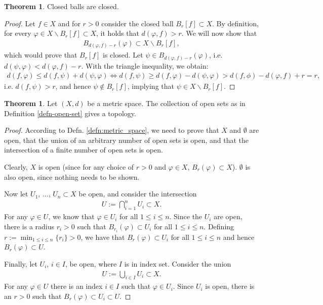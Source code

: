 \documentclass[12pt, a4paper]{article}
\numberwithin{equation}{section}
\theoremstyle{definition}
\theoremstyle{definition}
\newtheorem{theorem}[thm]{Theorem}
\begin{document}
	\begin{theorem}\label{thrm:closed_balls_open}
		Closed balls are closed.
	\end{theorem}
	
	\begin{proof}
		Let $f\in X$ and for $r > 0$ consider the closed ball $B_{r}[f]\subset X$. By definition, for every $\varphi \in X\backslash B_{r}[f]\subset X$, it holds that $d(\varphi, f) > r$. We will now show that 
		\begin{align}
			B_{d(\varphi, f) - r}(\varphi) \subset X \backslash B_{r}[f],
		\end{align}
		which would prove that $B_{r}[f]$ is closed. Let $\psi\in B_{d(\varphi, f) - r}(\varphi)$, i.e. $d(\psi, \varphi) < d(\varphi, f) -r$. With the triangle inequality, we obtain:
		\begin{align}
			d(f, \varphi) \leq d(f, \psi) + d(\psi, \varphi) \Leftrightarrow d(f, \psi) \geq d(f, \varphi) - d(\psi, \varphi) > d(f, \phi) - d(\varphi, f) + r = r, 
		\end{align}
		i.e. $d(f, \psi) > r$, and hence $\psi\notin B_r[f]$, implying that $\psi\in X\backslash B_{r}[f]$. 
	\end{proof}
	
	\begin{theorem}\label{thrm:open_sets_form_topology}
		Let $(X, d)$ be a metric space. The collection of open sets as in Definition \ref{defn-open-set} gives a topology.
	\end{theorem}
	\begin{proof}		
		According to Defn. \ref{defn:metric_space}, we need to prove that $X$ and $\emptyset$ are open, that the union of an arbitrary number of open sets is open, and that the intersection of a finite number of open sets is open. 
		
		Clearly, $X$ is open (since for any choice of $r > 0$ and $\varphi\in X$, $B_{r}(\varphi)\subset X$). $\emptyset$ is also open, since nothing needs to be shown.
		
		Now let $U_{1}$, $\dots$, $U_{n}\subset X$ be open, and consider the intersection
		\begin{align}
			U := \bigcap_{i=1}^{n}U_{i} \subset X.
		\end{align} 
		For any $\varphi\in U$, we know that $\varphi\in U_i$ for all $1\leq i \leq n$. Since the $U_{i}$ are open, there is a radius $r_{i} > 0$ such that $B_{r_i}(\varphi) \subset U_i$ for all $1\leq i \leq n$. Defining $r := \min_{1 \leq i \leq n}\{r_{i}\} > 0$, we have that $B_{r}(\varphi) \subset U_i$ for all $1\leq i\leq n$ and hence $B_{r}(\varphi)\subset U$.
		
		Finally, let $U_{i}$, $i\in I$, be open, where $I$ is in index set. Consider the union
		\begin{align}
			U := \bigcup_{i\in I}U_{i} \subset X.
		\end{align}
		For any $\varphi\in U$ there is an index $i\in I$ such that $\varphi\in U_i$. Since $U_i$ is open, there is an $r > 0$ such that $B_{r}(\varphi) \subset U_i \subset U$.
	\end{proof}
\end{document}
